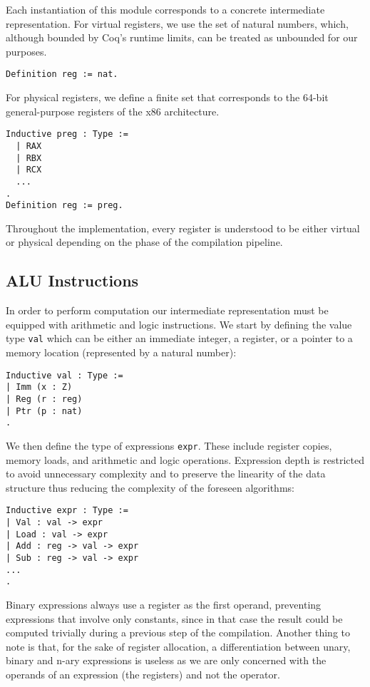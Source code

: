 Each instantiation of this module corresponds to a concrete intermediate representation. For virtual registers, we use the set of natural numbers, which, although bounded by Coq's runtime limits, can be treated as unbounded for our purposes.

\begin{lstlisting}[language=Coq]
Definition reg := nat.
\end{lstlisting}

For physical registers, we define a finite set that corresponds to the 64-bit general-purpose registers of the x86 architecture.

\begin{lstlisting}[language=Coq]
Inductive preg : Type :=
  | RAX
  | RBX
  | RCX
  ...
.
Definition reg := preg.
\end{lstlisting}

Throughout the implementation, every register is understood to be either virtual or physical depending on the phase of the compilation pipeline.

\subsection{ALU Instructions}

In order to perform computation our intermediate representation must be equipped with arithmetic and logic instructions.
We start by defining the value type \texttt{val} which can be either an immediate integer, a register, or a pointer to a memory location (represented by a natural number):

\begin{lstlisting}[language=Coq]
Inductive val : Type :=
| Imm (x : Z)
| Reg (r : reg)
| Ptr (p : nat)
.
\end{lstlisting}

We then define the type of expressions \texttt{expr}. These include register copies, memory loads, and arithmetic and logic operations. Expression depth is restricted to avoid unnecessary complexity and to preserve the linearity of the data structure thus reducing the complexity of the foreseen algorithms:

\begin{lstlisting}[language=Coq]
Inductive expr : Type :=
| Val : val -> expr
| Load : val -> expr
| Add : reg -> val -> expr
| Sub : reg -> val -> expr
...
.
\end{lstlisting}

Binary expressions always use a register as the first operand, preventing expressions that involve only constants, since in that case the result could be computed trivially during a previous step of the compilation. Another thing to note is that, for the sake of register allocation, a differentiation between unary, binary and n-ary expressions is useless as we are only concerned with the operands of an expression (the registers) and not the operator.

